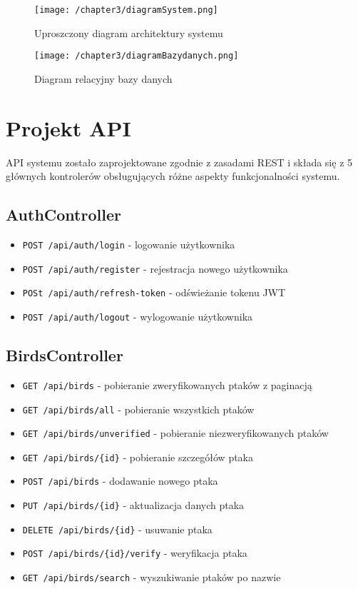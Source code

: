 \begin{figure}[!htb]
	\centering
	\texttt{[image: /chapter3/diagramSystem.png]}
	\caption{Uproszczony diagram architektury systemu}
	\label{fig:diagramSystem}
\end{figure}

\begin{figure}[!htb]
	\centering
	\texttt{[image: /chapter3/diagramBazydanych.png]}
	\caption{Diagram relacyjny bazy danych}
	\label{fig:diagramBazyDanych}
\end{figure}


\section{Projekt API}
API systemu zostało zaprojektowane zgodnie z zasadami REST i składa się z 5 głównych kontrolerów obsługujących różne aspekty funkcjonalności systemu.

\subsection{AuthController}
\begin{itemize}
	\item \texttt{POST /api/auth/login} - logowanie użytkownika
	\item \texttt{POST /api/auth/register} - rejestracja nowego użytkownika
	\item \texttt{POSt /api/auth/refresh-token} - odświeżanie tokenu JWT
	\item \texttt{POST /api/auth/logout} - wylogowanie użytkownika
\end{itemize}

\subsection{BirdsController}
\begin{itemize}
	\item \texttt{GET /api/birds} - pobieranie zweryfikowanych ptaków z paginacją
	\item \texttt{GET /api/birds/all} - pobieranie wszystkich ptaków
	\item \texttt{GET /api/birds/unverified} - pobieranie niezweryfikowanych ptaków
	\item \texttt{GET /api/birds/\{id\}} - pobieranie szczegółów ptaka
	\item \texttt{POST /api/birds} - dodawanie nowego ptaka
	\item \texttt{PUT /api/birds/\{id\}} - aktualizacja danych ptaka
	\item \texttt{DELETE /api/birds/\{id\}} - usuwanie ptaka
	\item \texttt{POST /api/birds/\{id\}/verify} - weryfikacja ptaka
	\item \texttt{GET /api/birds/search} - wyszukiwanie ptaków po nazwie
\end{itemize}

